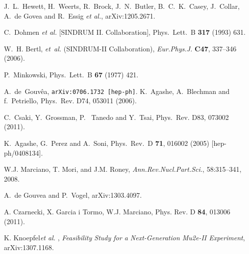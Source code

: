 \begin{thebibliography}{99}

% 
% 
  J.~L.~Hewett, H.~Weerts, R.~Brock, J.~N.~Butler, B.~C.~K.~Casey, J.~Collar, A.~de Govea and R.~Essig {\it et al.},
  arXiv:1205.2671.

  
  C.~Dohmen {\it et al.}  [SINDRUM II. Collaboration],
  Phys.\ Lett.\ B {\bf 317} (1993) 631.

W.~H. Bertl, {\it et~al.} (SINDRUM-II Collaboration), \emph{Eur.Phys.J.} \textbf{C47}, 337--346 (2006).

  P.~Minkowski,
  Phys.\ Lett.\ B {\bf 67} (1977) 421.
  
A.~de~Gouv{\^e}a, \texttt{arXiv:0706.1732 [hep-ph]}.
K.~Agashe, A.~Blechman and f.~Petriello,
Phys.~Rev. D74, 053011 (2006).

C.~Csaki, Y.~Grossman, P.~ Tanedo and Y.~Tsai,
Phys.~Rev. D83, 073002 (2011).

  K.~Agashe, G.~Perez and A.~Soni,
  Phys.\ Rev.\ D {\bf 71}, 016002 (2005)
  [hep-ph/0408134].

W.J. Marciano, T. Mori, and J.M. Roney,
\emph{Ann.Rev.Nucl.Part.Sci.}, 58:315--341, 2008.

  A.~de Gouvea and P.~Vogel,
  arXiv:1303.4097.

 A. Czarnecki, X. Garcia i Tormo, W.J. Marciano, 
  Phys. Rev. D {\bf 84}, 013006 (2011).


 K. Knoepfel{\it  et al.} , 
  {\it{Feasibility Study for a Next-Generation Mu2e-II Experiment}}, arXiv:1307.1168.


\end{thebibliography}
